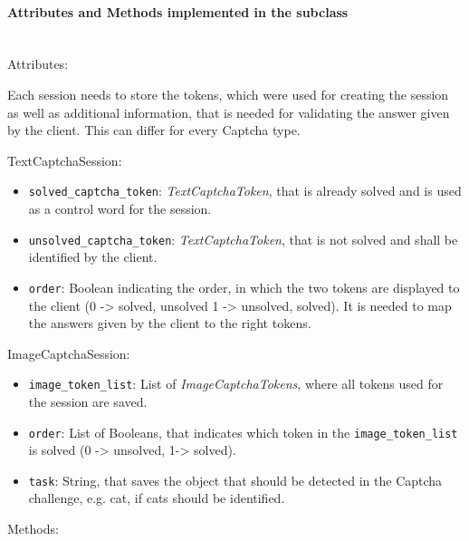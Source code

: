 \paragraph{Attributes and Methods implemented in the subclass} \mbox{} \\
Attributes:

Each session needs to store the tokens, which were used for creating the session as well as additional information, that is needed for validating the answer given by the client. This can differ for every Captcha type. 

TextCaptchaSession:

\begin{itemize} 
\item \verb|solved_captcha_token|: \emph{TextCaptchaToken}, that is already solved and is used as a control word for the session.
\item \verb|unsolved_captcha_token|: \emph{TextCaptchaToken}, that is not solved and shall be identified by the client.
\item \verb|order|: Boolean indicating the order, in which the two tokens are displayed to the client (0 -> solved, unsolved 1 -> unsolved, solved). It is needed to map the answers given by the client to the right tokens.
\end{itemize}


ImageCaptchaSession:

\begin{itemize}
\item \verb|image_token_list|: List of \emph{ImageCaptchaTokens}, where all tokens used for the session are saved.
\item \verb|order|: List of Booleans, that indicates which token in the \verb|image_token_list| is solved (0 -> unsolved, 1-> solved).
\item \verb|task|: String, that saves the object that should be detected in the Captcha challenge, e.g. cat, if cats should be identified.
\end{itemize}

Methods: 

